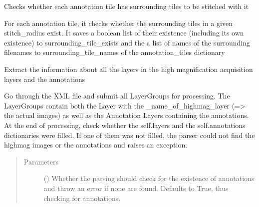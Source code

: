 \documentclass[letterpaper,10pt,english]{sphinxmanual}
\begin{document}
\begin{fulllineitems}
\begin{fulllineitems}
\label{\detokenize{index:sites_of_interest_parser.MapsXmlParser.determine_surrounding_tiles}}
Checks whether each annotation tile has surrounding tiles to be stitched with it

For each annotation tile, it checks whether the surrounding tiles in a given stitch\_radius exist. It saves a
boolean list of their existence (including its own existence) to surrounding\_tile\_exists and the a list of names
of the surrounding filenames to surrounding\_tile\_names of the annotation\_tiles dictionary

\end{fulllineitems}


\begin{fulllineitems}
\label{\detokenize{index:sites_of_interest_parser.MapsXmlParser.extract_layers_and_annotations}}
Extract the information about all the layers in the high magnification acquisition layers and the annotations

Go through the XML file and submit all LayerGroups for processing. The LayerGroups contain both the Layer with
the \_name\_of\_highmag\_layer (=\textgreater{} the actual images) as well as the Annotation Layers containing the annotations.
At the end of processing, check whether the self.layers and the self.annotations dictionaries were filled. If
one of them was not filled, the parser could not find the highmag images or the annotations and raises an
exception.
\begin{quote}\begin{description}
\item[{Parameters}] \leavevmode
{} () \textendash{} Whether the parsing should check for the existence of annotations and throw an
error if none are found. Defaults to True, thus checking for annotations.

\end{description}\end{quote}


\end{fulllineitems}
\end{fulllineitems}
\end{document}
